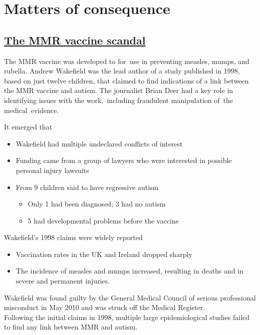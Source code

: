 \documentclass[
  10pt,
  b5paper]{book}
\providecommand{\tightlist}{%
  \setlength{\itemsep}{0pt}\setlength{\parskip}{0pt}}
\begin{document}
\hypertarget{matters-of-consequence}{%
\chapter{Matters of consequence}\label{matters-of-consequence}}

\hypertarget{the-mmr-vaccine-scandal}{%
\section{\texorpdfstring{\href{https://en.wikipedia.org/wiki/MMR_vaccine_controversy}{The MMR vaccine scandal}}{The MMR vaccine scandal}}\label{the-mmr-vaccine-scandal}}

The MMR vaccine was developed to for~use in preventing measles,
mumps, and rubella. Andrew Wakefield was the lead author of a
study published in 1998, based on just twelve children, that
claimed to find indications of a link between the MMR vaccine
and autism. The journalist Brian Deer had a key role in
identifying issues with the work,~including fraudulent
manipulation of~the medical~evidence.

It emerged that

\begin{itemize}
\tightlist
\item
  Wakefield had multiple undeclared conflicts of interest
\item
  Funding came from a group of lawyers who were interested
  in possible personal injury lawsuits
\item
  From 9 children said to have regressive autism

  \begin{itemize}
  \tightlist
  \item
    Only 1 had been diagnosed; 3 had no autism
  \item
    5 had developmental problems before the vaccine
  \end{itemize}
\end{itemize}

Wakefield's 1998 claims were widely reported

\begin{itemize}
\tightlist
\item
  Vaccination rates in the UK and Ireland dropped sharply
\item
  The incidence of measles and mumps increased, resulting
  in deaths and in severe and permanent injuries.
\end{itemize}

Wakefield was found guilty by the General Medical Council of serious professional misconduct in May 2010 and was struck off the Medical Register.\\
Following the initial claims in 1998, multiple large epidemiological studies failed to find any link between MMR and autism.
\end{document}

